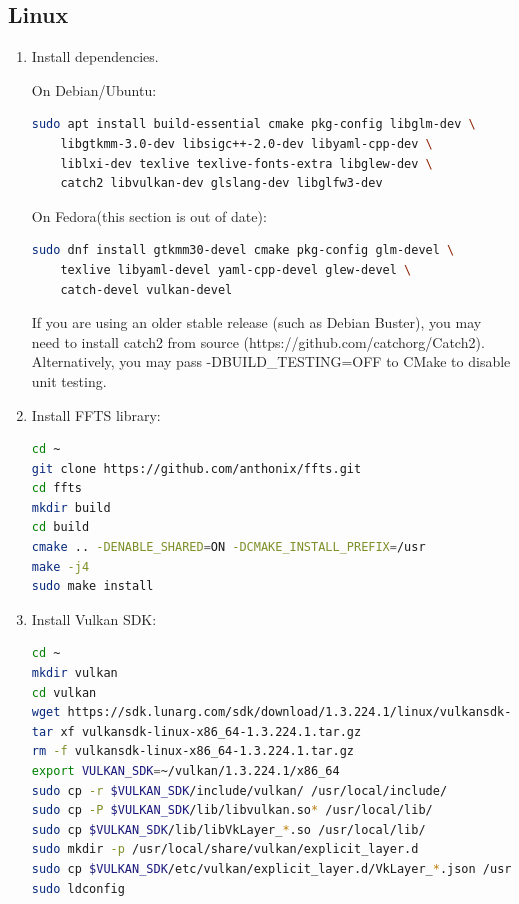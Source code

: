 \subsection{Linux}
\begin{enumerate}

\item Install dependencies.

On Debian/Ubuntu:

\begin{lstlisting}[language=sh, numbers=none]
sudo apt install build-essential cmake pkg-config libglm-dev \
	libgtkmm-3.0-dev libsigc++-2.0-dev libyaml-cpp-dev \
	liblxi-dev texlive texlive-fonts-extra libglew-dev \
	catch2 libvulkan-dev glslang-dev libglfw3-dev
\end{lstlisting}

On Fedora(this section is out of date):

\begin{lstlisting}[language=sh, numbers=none]
sudo dnf install gtkmm30-devel cmake pkg-config glm-devel \
	texlive libyaml-devel yaml-cpp-devel glew-devel \
	catch-devel vulkan-devel
\end{lstlisting}

If you are using an older stable release (such as Debian Buster), you may need to install catch2 from source
(https://github.com/catchorg/Catch2). Alternatively, you may pass -DBUILD\_TESTING=OFF to CMake to disable unit testing.

\item Install FFTS library:

\begin{lstlisting}[language=sh, numbers=none]
cd ~
git clone https://github.com/anthonix/ffts.git
cd ffts
mkdir build
cd build
cmake .. -DENABLE_SHARED=ON -DCMAKE_INSTALL_PREFIX=/usr
make -j4
sudo make install
\end{lstlisting}

\item Install Vulkan SDK:

\begin{lstlisting}[language=sh, numbers=none]
cd ~
mkdir vulkan
cd vulkan
wget https://sdk.lunarg.com/sdk/download/1.3.224.1/linux/vulkansdk-linux-x86_64-1.3.224.1.tar.gz
tar xf vulkansdk-linux-x86_64-1.3.224.1.tar.gz
rm -f vulkansdk-linux-x86_64-1.3.224.1.tar.gz
export VULKAN_SDK=~/vulkan/1.3.224.1/x86_64
sudo cp -r $VULKAN_SDK/include/vulkan/ /usr/local/include/
sudo cp -P $VULKAN_SDK/lib/libvulkan.so* /usr/local/lib/
sudo cp $VULKAN_SDK/lib/libVkLayer_*.so /usr/local/lib/
sudo mkdir -p /usr/local/share/vulkan/explicit_layer.d
sudo cp $VULKAN_SDK/etc/vulkan/explicit_layer.d/VkLayer_*.json /usr/local/share/vulkan/explicit_layer.d
sudo ldconfig
\end{lstlisting}


\end{enumerate}
